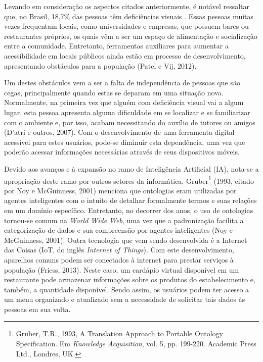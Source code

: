 Levando em consideração os aspectos citados anteriormente, é notável ressaltar que, no Brasil, 18,7\% das pessoas têm deficiências visuais \cite{IBGE2011}. Essas pessoas muitas vezes frequentam locais, como universidades e empresas, que possuem bares ou restaurantes próprios, os quais vêm a ser um espaço de alimentação e socialização entre a comunidade. Entretanto, ferramentas auxiliares para aumentar a acessibilidade em locais públicos ainda estão em processo de desenvolvimento, apresentando obstáculos para a população (Patel e Vij, 2012)\nocite{PATEL2012}.

Um destes obstáculos vem a ser a falta de independência de pessoas que são cegas, principalmente quando estas se deparam em uma situação nova. Normalmente, na primeira vez que alguém com deficiência visual vai a algum lugar, esta pessoa apresenta alguma dificuldade em se localizar e se familiarizar com o ambiente e, por isso, acabam necessitando do auxílio de tutores ou amigos (D’atri e outros, 2007)\nocite{DATRI2007}. Com o desenvolvimento de uma ferramenta digital acessível para estes usuários, pode-se diminuir esta dependência, uma vez que poderão acessar informações necessárias através de seus dispositivos móveis.

Devido aos avanços e à expansão no ramo de Inteligência Artificial (IA), nota-se a apropriação deste ramo por outros setores da informática. Gruber\footnote{Gruber, T.R., 1993,  A Translation Approach to Portable Ontology Specification. Em \emph{Knowledge Acquisition}, vol. 5, pp. 199-220. Academic Press Ltd., Londres, UK.} (1993, citado por Noy e McGuinness, 2001) menciona que ontologias eram utilizadas por agentes inteligentes com o intuito de detalhar formalmente termos e suas relações em um domínio específico. Entretanto, no decorrer dos anos, o uso de ontologias tornou-se comum na \textit{World Wide Web}, uma vez que a padronização facilita a categorização de dados e sua compreensão por agentes inteligentes (Noy e McGuinness, 2001)\nocite{NOY2001}. Outra tecnologia que vem sendo desenvolvida é a Internet das Coisas (IoT, do inglês \emph{Internet of Things}). Com este desenvolvimento, aparelhos comuns podem ser conectados à internet para prestar serviços à população (Friess, 2013). Neste caso, um cardápio virtual disponível em um restaurante pode armazenar informações sobre os produtos do estabelecimento e, também, a quantidade disponível. Sendo assim, os usuários podem ter acesso a um menu organizado e atualizado sem a necessidade de solicitar tais dados às pessoas em sua volta.


